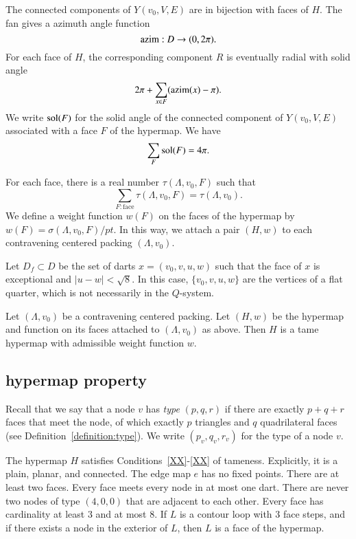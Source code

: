 The connected components of $Y(v_0,V,E)$ are in bijection with
faces of $H$.  
The fan gives a azimuth angle function
$$
{\operatorname{azim}} : D \to (0,2\pi).
$$
For each face of $H$, the corresponding component $R$
is eventually radial with solid
angle
  $$
  2\pi + \sum_{x\in F} ({\operatorname{azim}}(x) -\pi).
  $$
We write $\operatorname{sol}(F)$ for the solid angle of the connected component
of $Y(v_0,V,E)$ associated with a face $F$ of the hypermap.
We have
    $$\sum_{F} \operatorname{sol}(F) = 4\pi.$$


For each face, there is a
real number $\tau(\Lambda,v_0,F)$ such that
$$
  \sum_{F : \text{face}}\tau(\Lambda,v_0,F) = \tau(\Lambda,v_0).
$$
We define a weight function $w(F)$ on the faces of the hypermap
by $w(F) = \sigma(\Lambda,v_0,F)/pt$.  In this way, we attach
a pair $(H,w)$ to each contravening centered packing $(\Lambda,v_0)$.


Let $D_f\subset D$ be the set of darts 
   $x = (v_0,v,u,w)$
such that the face of $x$ is exceptional and $|u-w|<\sqrt8$.
In this case, $\{v_0,v,u,w\}$ are the vertices of a flat quarter,
which is not necessarily in the $Q$-system.

\begin{theorem} \label{theorem:contravene}
Let $(\Lambda,v_0)$ be a contravening centered packing.  Let $(H,w)$ be
the hypermap and function on its faces attached to $(\Lambda,v_0)$ as above.
Then $H$ is a tame hypermap with admissible weight function $w$.
\end{theorem}




\subsection{hypermap property}
    \label{sec:startame}


Recall that we say that a node $v$ has {\it type\/} $(p,q,r)$ if
there are exactly $p+q+r$ faces that meet the node, of which exactly
$p$ triangles and $q$ quadrilateral faces (see
Definition~\ref{definition:type}).  We write $(p_v,q_v,r_v)$ for the
type of a node $v$.

\begin{lemma} The hypermap $H$ satisfies Conditions~\ref{XX}-\ref{XX} 
of tameness.
Explicitly, it is a plain, planar, and connected. The edge map $e$
has no fixed points. There are at least two faces. Every face meets
every node in at most one dart.  There are never two nodes of type
$(4,0,0)$ that are adjacent to each other.  Every face has
cardinality at least $3$ and at most $8$.  If $L$ is a contour loop
with $3$ face steps, and if there exists a node in the exterior of
$L$, then $L$ is a face of the hypermap.
\end{lemma}


